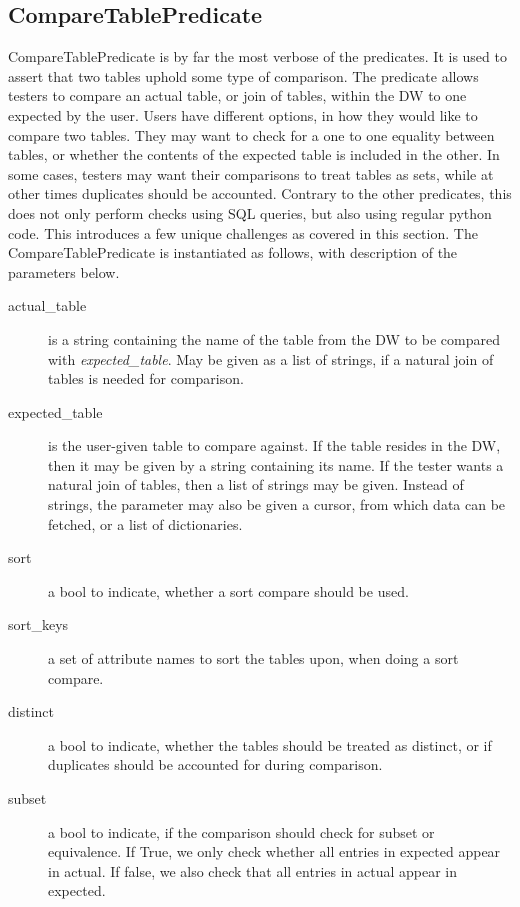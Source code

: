 \subsection{CompareTablePredicate}
CompareTablePredicate is by far the most verbose of the predicates. It is used to assert that two tables uphold some type of comparison. The predicate allows testers to compare an actual table, or join of tables, within the DW to one expected by the user. Users have different options, in how they would like to compare two tables. They may want to check for a one to one equality between tables, or whether the contents of the expected table is included in the other. In some cases, testers may want their comparisons to treat tables as sets, while at other times duplicates should be accounted. Contrary to the other predicates, this does not only perform checks using SQL queries, but also using regular python code. This introduces a few unique challenges as covered in this section. The CompareTablePredicate is instantiated as follows, with description of the parameters below.


\begin{description}
\item [actual\_table] is a string containing the name of the table from the DW to be compared with \textit{expected\_table}. May be given as a list of strings, if a natural join of tables is needed for comparison.
\item [expected\_table] is the user-given table to compare against. If the table resides in the DW, then it may be given by a string containing its name. If the tester wants a natural join of tables, then a list of strings may be given. Instead of strings, the parameter may also be given a cursor, from which data can be fetched, or a list of dictionaries.
\item [sort] a bool to indicate, whether a sort compare should be used.
\item [sort\_keys] a set of attribute names to sort the tables upon, when doing a sort compare.
\item [distinct] a bool to indicate, whether the tables should be treated as distinct, or if duplicates should be accounted for during comparison.
\item [subset] a bool to indicate, if the comparison should check for subset or equivalence.  If True, we only check whether all entries in expected appear in actual. If false, we also check that all entries in actual appear in expected. 
\end{description}


